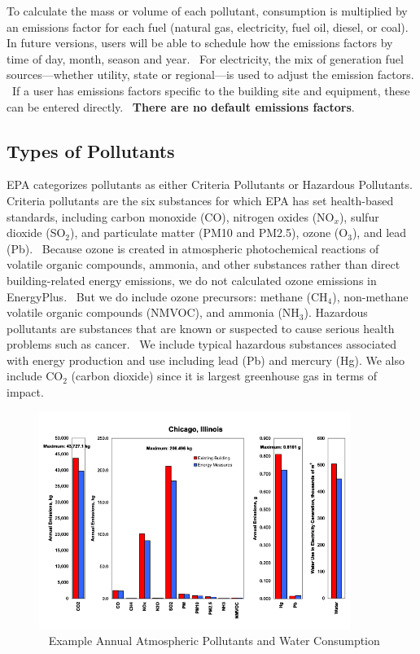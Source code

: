 To calculate the mass or volume of each pollutant, consumption is multiplied by an emissions factor for each fuel (natural gas, electricity, fuel oil, diesel, or coal). In future versions, users will be able to schedule how the emissions factors by time of day, month, season and year.~ For electricity, the mix of generation fuel sources---whether utility, state or regional---is used to adjust the emission factors. ~If a user has emissions factors specific to the building site and equipment, these can be entered directly.~ \textbf{There are no default emissions factors}.

\subsection{Types of Pollutants}\label{types-of-pollutants}

EPA categorizes pollutants as either Criteria Pollutants or Hazardous Pollutants. Criteria pollutants are the six substances for which EPA has set health-based standards, including carbon monoxide (CO), nitrogen oxides (NO\(_{x}\)), sulfur dioxide (SO\(_{2}\)), and particulate matter (PM10 and PM2.5), ozone (O\(_{3}\)), and lead (Pb).~ Because ozone is created in atmospheric photochemical reactions of volatile organic compounds, ammonia, and other substances rather than direct building-related energy emissions, we do not calculated ozone emissions in EnergyPlus.~ But we do include ozone precursors: methane (CH\(_{4}\)), non-methane volatile organic compounds (NMVOC), and ammonia (NH\(_{3}\)). Hazardous pollutants are substances that are known or suspected to cause serious health problems such as cancer.~ We include typical hazardous substances associated with energy production and use including lead (Pb) and mercury (Hg). We also include CO\(_{2}\) (carbon dioxide) since it is largest greenhouse gas in terms of impact.

\begin{figure}[hbtp] %
\centering
\includegraphics[width=0.9\textwidth, height=0.9\textheight, keepaspectratio=true]{media/image7910.svg.png}
\caption{  Example Annual Atmospheric Pollutants and Water Consumption \protect \label{fig:example-annual-atmospheric-pollutants}}
\end{figure}

